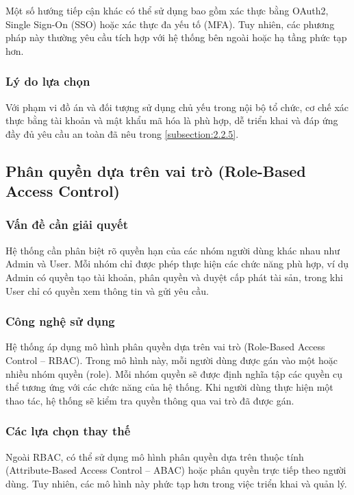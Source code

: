 \documentclass[../DoAn.tex]{subfiles}
\begin{document}
Một số hướng tiếp cận khác có thể sử dụng bao gồm xác thực bằng OAuth2, Single Sign-On (SSO) hoặc xác thực đa yếu tố (MFA). Tuy nhiên, các phương pháp này thường yêu cầu tích hợp với hệ thống bên ngoài hoặc hạ tầng phức tạp hơn.

\subsubsection{Lý do lựa chọn}

Với phạm vi đồ án và đối tượng sử dụng chủ yếu trong nội bộ tổ chức, cơ chế xác thực bằng tài khoản và mật khẩu mã hóa là phù hợp, dễ triển khai và đáp ứng đầy đủ yêu cầu an toàn đã nêu trong \autoref{subsection:2.2.5}.

\subsection{Phân quyền dựa trên vai trò (Role-Based Access Control)}

\subsubsection{Vấn đề cần giải quyết}

Hệ thống cần phân biệt rõ quyền hạn của các nhóm người dùng khác nhau như Admin và User. Mỗi nhóm chỉ được phép thực hiện các chức năng phù hợp, ví dụ Admin có quyền tạo tài khoản, phân quyền và duyệt cấp phát tài sản, trong khi User chỉ có quyền xem thông tin và gửi yêu cầu.

\subsubsection{Công nghệ sử dụng}

Hệ thống áp dụng mô hình phân quyền dựa trên vai trò (Role-Based Access Control – RBAC). Trong mô hình này, mỗi người dùng được gán vào một hoặc nhiều nhóm quyền (role). Mỗi nhóm quyền sẽ được định nghĩa tập các quyền cụ thể tương ứng với các chức năng của hệ thống. Khi người dùng thực hiện một thao tác, hệ thống sẽ kiểm tra quyền thông qua vai trò đã được gán.

\subsubsection{Các lựa chọn thay thế}

Ngoài RBAC, có thể sử dụng mô hình phân quyền dựa trên thuộc tính (Attribute-Based Access Control – ABAC) hoặc phân quyền trực tiếp theo người dùng. Tuy nhiên, các mô hình này phức tạp hơn trong việc triển khai và quản lý.
\end{document}
